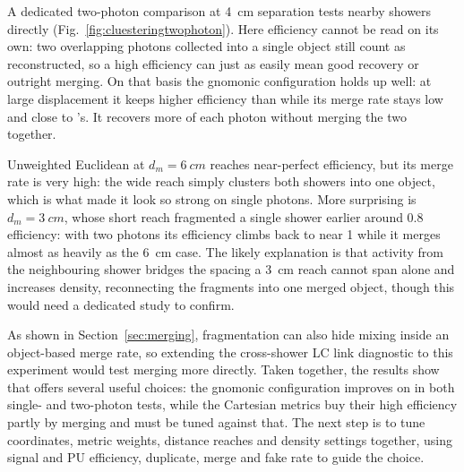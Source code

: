 A dedicated two-photon comparison at \SI{4}{cm} separation tests nearby showers
directly (Fig.~\ref{fig:cluesteringtwophoton}). Here efficiency cannot be read
on its own: two overlapping photons collected into a single object still count
as reconstructed, so a high efficiency can just as easily mean good recovery or
outright merging. On that
basis the gnomonic configuration holds up well: at large displacement it keeps
higher efficiency than \cluethreed{} while its merge rate stays low and close
to \cluethreed{}'s. It recovers more of each photon without merging the two
together.

Unweighted Euclidean
at $d_m=\SI{6}{cm}$ reaches near-perfect efficiency, but its merge rate is very high:
the wide reach simply clusters both showers into one object, which is what made
it look so strong on single photons. More surprising is $d_m=\SI{3}{cm}$, whose short
reach fragmented a single shower earlier around 0.8 efficiency: with two photons its efficiency climbs
back to near 1 while it merges almost as heavily as the \SI{6}{cm} case. The
likely explanation is that activity from the neighbouring shower bridges the
spacing a \SI{3}{cm} reach cannot span alone and increases density, reconnecting the fragments into one
merged object, though this would need a dedicated study to confirm.

As shown in Section~\ref{sec:merging}, fragmentation can also hide mixing
inside an object-based merge rate, so extending the cross-shower LC link
diagnostic to this experiment would test merging more directly. Taken
together, the results show that \cluestering{} offers several useful choices:
the gnomonic configuration improves on \cluethreed{} in both single- and
two-photon tests, while the Cartesian metrics buy their high efficiency partly
by merging and must be tuned against that. The next
step is to tune coordinates, metric weights,
distance reaches and density settings together, using signal and PU efficiency, duplicate, merge and fake rate to guide the choice.
